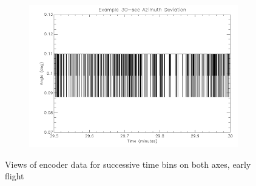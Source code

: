 \begin{figure}[htbp]
\begin{subfigure}{0.45\textwidth}
		\caption{}
		\label{fig:sub:earlyalt30}
	\end{subfigure}
	\begin{subfigure}{0.45\textwidth}
		\includegraphics[width=1\linewidth]{appendix/img/campaign_results/earlyaz30sec.png}
		\caption{}
		\label{fig:sub:earlyaz30}
	\end{subfigure}
	\caption{Views of encoder data for successive time bins on both axes, early flight}
	\label{fig:earlyflight}
\end{figure}

